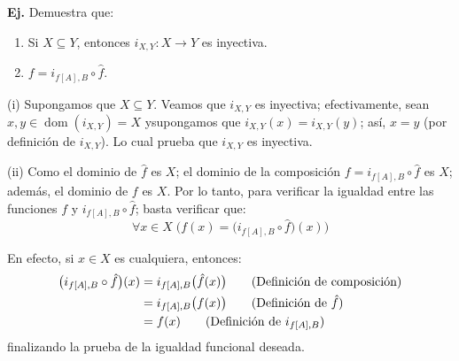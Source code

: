 \documentclass[letterpaper,DIV=14,headsepline,12pt]{scrartcl}
\makeatletter
\newcounter{Ejer}
\newcommand{\pts}{}
\newenvironment{ejercicio}[1]{\noindent
    \ifthenelse{\equal{#1}{1} \OR \equal{#1}{+1}}{\renewcommand{\pts}{\textbf{(#1 pt)}}}{\renewcommand{\pts}{\textbf{(#1 pts)}}}\textbf{Ej. \theEjer} \pts\stepcounter{Ejer}}{\vspace{.3cm}}
\DeclareMathOperator{\dom}{dom}
\renewenvironment{proof}[1][]{%
        \par\pushQED{\qed}%
        \normalfont\topsep6pt \partopsep0pt %
        \trivlist
        \item[\hskip\labelsep
                \textbf{\textit{Demostración.}}%
        ]#1
        }{%
        \popQED\endtrivlist\@endpefalse
    }
\makeatother
\begin{document}
    \begin{ejercicio}{1.5}
        Demuestra que:
        \begin{enumerate}
            \item Si $X \subseteq Y$, entonces $i_{X,Y}\colon X \to Y$ es inyectiva.
            \item $f=i_{f[A],B} \circ \hat{f}$.
        \end{enumerate}
    \end{ejercicio}
    \begin{proof}
        (i) Supongamos que $X \subseteq Y$. Veamos que $i_{X,Y}$ es inyectiva; efectivamente, sean $x,y \in \dom(i_{X,Y})=X$ ysupongamos que $i_{X,Y}(x)=i_{X,Y}(y)$; así, $x=y$ (por definición de $i_{X,Y}$). Lo cual prueba que $i_{X,Y}$ es inyectiva.

        (ii) Como el dominio de $\hat{f}$ es $X$; el dominio de la composición $f=i_{f[A],B} \circ \hat{f}$ es $X$; además, el dominio de $f$ es $X$. Por lo tanto, para verificar la igualdad entre las funciones $f$ y $i_{f[A],B} \circ \hat{f}$; basta verificar que:
        \[ \forall x \in X \; \big( f(x) = \big( i_{f[A],B} \circ \hat{f} \big)(x) \big) \]

        En efecto, si $x \in X$ es cualquiera, entonces:
        \begin{align*}
            \big( i_{f[A],B} \circ \hat{f} \big) (x) &= i_{f[A],B} \big( \hat{f} (x) \big) \tag*{(Definición de composición)} \\
            &= i_{f[A],B} \big( f (x) \big) \tag*{(Definición de $\hat{f}$)} \\
            &= f(x) \tag*{(Definición de $i_{f[A],B}$)}
        \end{align*}
        finalizando la prueba de la igualdad funcional deseada.
    \end{proof}
\end{document}
